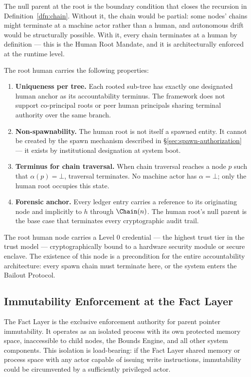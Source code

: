 The null parent at the root is the boundary condition that closes the recursion in Definition~\ref{dfn:chain}. Without it, the chain would be partial: some nodes' chains might terminate at a machine actor rather than a human, and autonomous drift would be structurally possible. With it, every chain terminates at a human by definition — this is the Human Root Mandate, and it is architecturally enforced at the runtime level.

The root human carries the following properties:

\begin{enumerate}
    \item \textbf{Uniqueness per tree.} Each rooted sub-tree has exactly one designated human anchor as its accountability terminus. The framework does not support co-principal roots or peer human principals sharing terminal authority over the same branch.
    \item \textbf{Non-spawnability.} The human root is not itself a spawned entity. It cannot be created by the spawn mechanism described in \S\ref{sec:spawn-authorization} — it exists by institutional designation at system boot.
    \item \textbf{Terminus for chain traversal.} When chain traversal reaches a node $p$ such that $\alpha(p) = \bot$, traversal terminates. No machine actor has $\alpha = \bot$; only the human root occupies this state.
    \item \textbf{Forensic anchor.} Every ledger entry carries a reference to its originating node and implicitly to $h$ through $\Chain(n)$. The human root's null parent is the base case that terminates every cryptographic audit trail.
\end{enumerate}

The root human node carries a Level 0 credential — the highest trust tier in the \bxthree{} trust model — cryptographically bound to a hardware security module or secure enclave. The existence of this node is a precondition for the entire accountability architecture: every spawn chain must terminate here, or the system enters the Bailout Protocol.

\subsection{Immutability Enforcement at the Fact Layer}
\label{sec:fact-layer-enforcement}

The Fact Layer is the exclusive enforcement authority for parent pointer immutability. It operates as an isolated process with its own protected memory space, inaccessible to child nodes, the Bounds Engine, and all other system components. This isolation is load-bearing: if the Fact Layer shared memory or process space with any actor capable of issuing write instructions, immutability could be circumvented by a sufficiently privileged actor.


